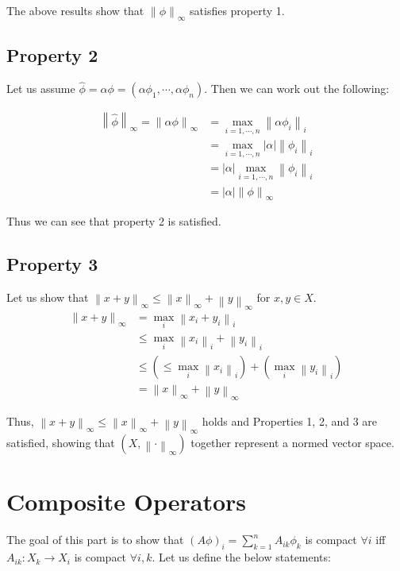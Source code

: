 \documentclass{article}[11pt]
\newcommand{\norm}[1]{\left\lVert#1\right\rVert}
\begin{document}
   The above results show that $\norm{\phi}_{\infty}$ satisfies property 1.
   
   \subsection{Property 2}
   Let us assume $\hat{\phi} = \alpha \phi = \left( \alpha \phi_1, \cdots, \alpha \phi_n \right)$. Then we can work out the following:
   
   \begin{align*}
   \norm{\hat{\phi}}_{\infty} = \norm{\alpha \phi}_{\infty}&= \max_{i = 1, \cdots, n} \norm{\alpha \phi_i}_i \\
   &= \max_{i = 1, \cdots, n} |\alpha| \norm{\phi_i}_i \\
   &= |\alpha| \max_{i = 1, \cdots, n} \norm{\phi_i}_i \\
   &= |\alpha| \norm{\phi}_{\infty}
   \end{align*}
   
   Thus we can see that property 2 is satisfied.
   
   \subsection{Property 3}
   Let us show that $\norm{x+y}_\infty \leq \norm{x}_\infty + \norm{y}_\infty$ for $x,y \in X$.
   \begin{align*}
   \norm{x+y}_\infty &= \max_i \norm{x_i + y_i}_i \\
   &\leq \max_i \norm{x_i}_i + \norm{y_i}_i \\
   &\leq \left(\leq \max_i \norm{x_i}_i \right) + \left(\max_i \norm{y_i}_i\right) \\
   &= \norm{x}_{\infty} + \norm{y}_{\infty}
   \end{align*}
   
   Thus, $\norm{x+y}_\infty \leq \norm{x}_\infty + \norm{y}_\infty$ holds and Properties 1, 2, and 3 are satisfied, showing that $\left(X, \norm{\cdot}_{\infty}\right)$ together represent a normed vector space.
   
   \section{Composite Operators}
   The goal of this part is to show that $\left(A\phi\right)_i = \sum_{k=1}^n A_{ik} \phi_k$ is compact $\forall i$ iff $A_{ik}: X_k \rightarrow X_i$ is compact $\forall i,k$. Let us define the below statements:
   
\end{document}
